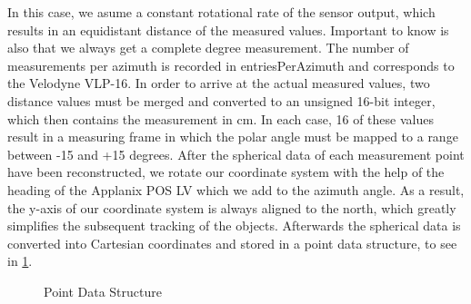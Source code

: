 \documentclass[11pt,oneside,openright]{mpreport}
\begin{document}
In this case, we asume a constant rotational rate of the sensor output, which results in an equidistant distance of the measured values. Important to know is also 
that we always get a complete degree measurement. The number of measurements per azimuth is recorded in 
entriesPerAzimuth and corresponds to the Velodyne VLP-16. In order to arrive at the actual measured values, two distance values must be merged and converted to an unsigned 16-bit integer,
which then contains the measurement in cm. In each case, 16 of these values result in a measuring frame in which the polar angle must be mapped to a range between -15 and +15 degrees.
After the spherical data of each measurement point have been reconstructed, we rotate our coordinate system with the help of the heading of the Applanix POS LV
which we add to the azimuth angle. As a result, the y-axis of our coordinate system is always aligned to the north, which greatly simplifies the subsequent tracking of the objects.
Afterwards the spherical data is converted into Cartesian coordinates and stored in a point data structure, to see in \cref{pcdc}.

\begin{figure}[!ht]
\caption{Point Data Structure}
  \begin{center}
  \end{center}
\label{pcdc}
\end{figure}
\end{document}
